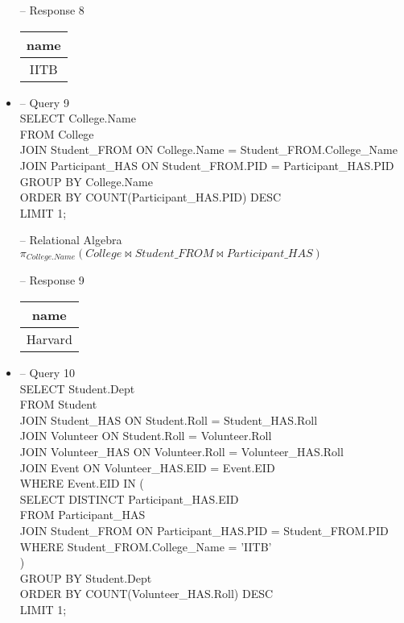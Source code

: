 \documentclass[7pt]{article}
\begin{document}
\begin{itemize}
    -- Response 8 \\
    \begin{tabular}{|c|}
        \hline
        name \\
        \hline
        IITB \\
        \hline
    \end{tabular}

    \newpage

    \item -- Query 9 \\
    SELECT College.Name \\
    FROM College    \\
    JOIN Student\_FROM ON College.Name = Student\_FROM.College\_Name   \\
    JOIN Participant\_HAS ON Student\_FROM.PID = Participant\_HAS.PID  \\
    GROUP BY College.Name   \\
    ORDER BY COUNT(Participant\_HAS.PID) DESC    \\
    LIMIT 1;    \vspace{2pt}

    -- Relational Algebra \\
    $\pi_{College.Name}(College \bowtie Student\_FROM \bowtie Participant\_HAS)$ \vspace{2pt}

    -- Response 9 \\
    \begin{tabular}{|c|}
        \hline
        name \\
        \hline
        Harvard \\
        \hline
    \end{tabular}

    \item -- Query 10 \\
    SELECT Student.Dept \\
    FROM Student    \\
    JOIN Student\_HAS ON Student.Roll = Student\_HAS.Roll \\
    JOIN Volunteer ON Student.Roll = Volunteer.Roll \\
    JOIN Volunteer\_HAS ON Volunteer.Roll = Volunteer\_HAS.Roll   \\
    JOIN Event ON Volunteer\_HAS.EID = Event.EID \\
    WHERE Event.EID IN (    \\
        SELECT DISTINCT Participant\_HAS.EID \\
        FROM Participant\_HAS    \\
        JOIN Student\_FROM ON Participant\_HAS.PID = Student\_FROM.PID \\
        WHERE Student\_FROM.College\_Name = 'IITB'    \\
    ) \\
    GROUP BY Student.Dept   \\
    ORDER BY COUNT(Volunteer\_HAS.Roll) DESC \\
    LIMIT 1;    \vspace{2pt}


\end{itemize}
\end{document}
